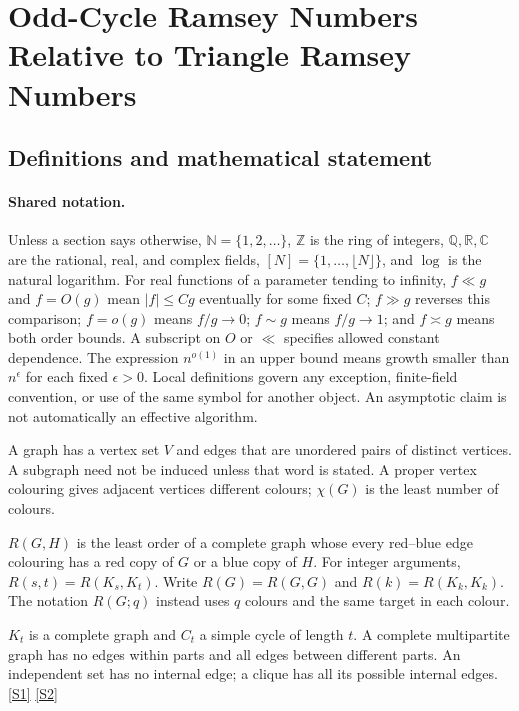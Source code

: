 \documentclass[11pt,a4paper]{article}
\newcommand{\N}{\mathbb{N}}
\newcommand{\Z}{\mathbb{Z}}
\newcommand{\Q}{\mathbb{Q}}
\newcommand{\R}{\mathbb{R}}
\newcommand{\C}{\mathbb{C}}
\newcommand{\sref}[2]{\hyperlink{source:#1:#2}{[S#2]}}
\begin{document}
\section{Odd-Cycle Ramsey Numbers Relative to Triangle Ramsey Numbers}\label{statement}


\subsection{Definitions and mathematical statement}

\paragraph{Shared notation.}Unless a section says otherwise, $\N=\{1,2,\ldots\}$,
$\Z$ is the ring of integers, $\Q,\R,\C$ are the rational, real, and complex
fields, $[N]=\{1,\ldots,\lfloor N\rfloor\}$, and $\log$ is the natural
logarithm. For real functions of a parameter tending to infinity,
$f\ll g$ and $f=O(g)$ mean $|f|\leq Cg$ eventually for some fixed $C$;
$f\gg g$ reverses this comparison; $f=o(g)$ means $f/g\to0$;
$f\sim g$ means $f/g\to1$; and $f\asymp g$ means both order bounds.
A subscript on $O$ or $\ll$ specifies allowed constant dependence.
The expression $n^{o(1)}$ in an upper bound means growth smaller than
$n^\epsilon$ for each fixed $\epsilon>0$. Local definitions govern any
exception, finite-field convention, or use of the same symbol for another
object. An asymptotic claim is not automatically an effective algorithm.



A graph has a vertex set $V$ and edges that are unordered pairs of distinct vertices. A subgraph need not be induced unless that word is stated. A proper vertex colouring gives adjacent vertices different colours; $\chi(G)$ is the least number of colours.

$R(G,H)$ is the least order of a complete graph whose every red--blue edge colouring has a red copy of $G$ or a blue copy of $H$. For integer arguments, $R(s,t)=R(K_s,K_t)$. Write $R(G)=R(G,G)$ and $R(k)=R(K_k,K_k)$. The notation $R(G;q)$ instead uses $q$ colours and the same target in each colour.

$K_t$ is a complete graph and $C_t$ a simple cycle of length $t$. A complete multipartite graph has no edges within parts and all edges between different parts. An independent set has no internal edge; a clique has all its possible internal edges. \sref{statement}{1} \sref{statement}{2}
\end{document}
